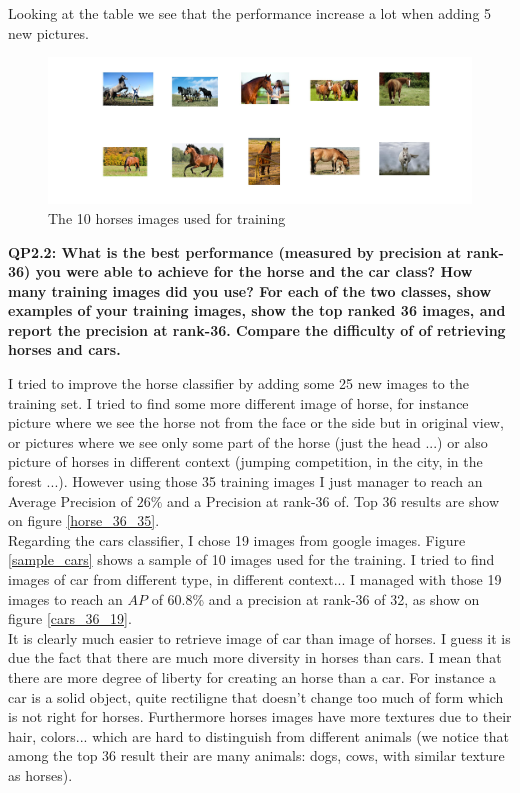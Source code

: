 \documentclass[a4paper,11pt]{exam}
\begin{document}
Looking at the table we see that the performance increase a lot when adding 5 new pictures.

\begin{figure}[!h]
\centering
\includegraphics[width=16cm]{figures/10_pic_horses.jpg}
\caption{The 10 horses images used for training}    
\label{10_pic_horses}
\end{figure}

\textbf{QP2.2: What is the best performance (measured by precision at rank-36) you were able to achieve for the horse and the car class? How many training images did you use? For each of the two classes, show examples of your training images, show the top ranked 36 images, and report the precision at rank-36. Compare the difficulty of of retrieving horses and cars.\\}

I tried to improve the horse classifier by adding some 25 new images to the training set. I tried to find some more different image of horse, for instance picture where we see the horse not from the face or the side but in original view, or pictures where we see only some part of the horse (just the head ...) or also picture of horses in different context (jumping competition, in the city, in the forest ...). However using those 35 training images I just manager to reach an Average Precision of $26\%$ and a Precision at rank-36 of. Top 36 results are show on figure \ref{horse_36_35}.\\

Regarding the cars classifier, I chose 19 images from google images. Figure \ref{sample_cars} shows a sample of 10 images used for the training. I tried to find images of car from different type, in different context... I managed with those 19 images to reach an $AP$ of 60.8\% and a precision at rank-36 of 32, as show on figure \ref{cars_36_19}.\\

It is clearly much easier to retrieve image of car than image of horses. I guess it is due the fact that there are much more diversity in horses than cars. I mean that there are more degree of liberty for creating an horse than a car. For instance a car is a solid object, quite rectiligne that doesn't change too much of form which is not right for horses. Furthermore horses images have more textures due to their hair, colors... which are hard to distinguish from different animals (we notice that among the top 36 result their are many animals: dogs, cows, with similar texture as horses).
\end{document}
